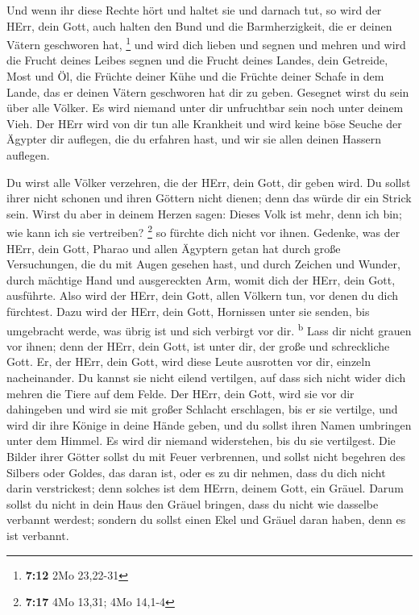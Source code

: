  Und wenn ihr diese Rechte hört und haltet sie und
darnach tut, so wird der HErr, dein Gott, auch halten den Bund und die
Barmherzigkeit, die er deinen Vätern geschworen hat, \footnote{\textbf{7:12}
  2Mo 23,22-31}  und wird dich lieben und segnen und
mehren und wird die Frucht deines Leibes segnen und die Frucht deines
Landes, dein Getreide, Most und Öl, die Früchte deiner Kühe und die
Früchte deiner Schafe in dem Lande, das er deinen Vätern geschworen hat
dir zu geben.  Gesegnet wirst du sein über alle Völker.
Es wird niemand unter dir unfruchtbar sein noch unter deinem Vieh.
 Der HErr wird von dir tun alle Krankheit und wird keine
böse Seuche der Ägypter dir auflegen, die du erfahren hast, und wir sie
allen deinen Hassern auflegen.

 Du wirst alle Völker verzehren, die der HErr, dein Gott,
dir geben wird. Du sollst ihrer nicht schonen und ihren Göttern nicht
dienen; denn das würde dir ein Strick sein.  Wirst du
aber in deinem Herzen sagen: Dieses Volk ist mehr, denn ich bin; wie
kann ich sie vertreiben? \footnote{\textbf{7:17} 4Mo 13,31; 4Mo 14,1-4}
 so fürchte dich nicht vor ihnen. Gedenke, was der HErr,
dein Gott, Pharao und allen Ägyptern getan hat  durch
große Versuchungen, die du mit Augen gesehen hast, und durch Zeichen und
Wunder, durch mächtige Hand und ausgereckten Arm, womit dich der HErr,
dein Gott, ausführte. Also wird der HErr, dein Gott, allen Völkern tun,
vor denen du dich fürchtest.  Dazu wird der HErr, dein
Gott, Hornissen unter sie senden, bis umgebracht werde, was übrig ist
und sich verbirgt vor dir. \textsuperscript{b}  Lass dir
nicht grauen vor ihnen; denn der HErr, dein Gott, ist unter dir, der
große und schreckliche Gott.  Er, der HErr, dein Gott,
wird diese Leute ausrotten vor dir, einzeln nacheinander. Du kannst sie
nicht eilend vertilgen, auf dass sich nicht wider dich mehren die Tiere
auf dem Felde.  Der HErr, dein Gott, wird sie vor dir
dahingeben und wird sie mit großer Schlacht erschlagen, bis er sie
vertilge,  und wird dir ihre Könige in deine Hände geben,
und du sollst ihren Namen umbringen unter dem Himmel. Es wird dir
niemand widerstehen, bis du sie vertilgest.  Die Bilder
ihrer Götter sollst du mit Feuer verbrennen, und sollst nicht begehren
des Silbers oder Goldes, das daran ist, oder es zu dir nehmen, dass du
dich nicht darin verstrickest; denn solches ist dem HErrn, deinem Gott,
ein Gräuel.  Darum sollst du nicht in dein Haus den
Gräuel bringen, dass du nicht wie dasselbe verbannt werdest; sondern du
sollst einen Ekel und Gräuel daran haben, denn es ist verbannt.

